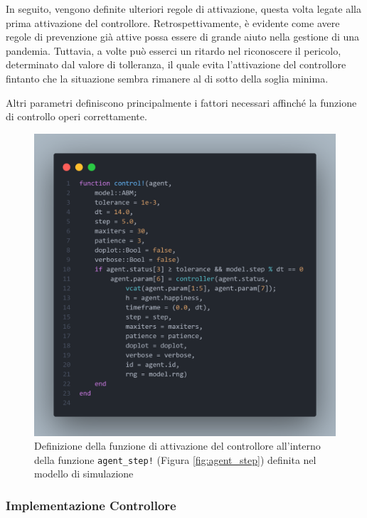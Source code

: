In seguito, vengono definite ulteriori regole di attivazione, 
questa volta legate alla prima attivazione del controllore. 
Retrospettivamente, è evidente come avere regole di prevenzione 
già attive possa essere di grande aiuto nella gestione di una pandemia. 
Tuttavia, a volte può esserci un ritardo nel riconoscere il pericolo, 
determinato dal valore di tolleranza, il quale evita l'attivazione 
del controllore fintanto che la situazione sembra rimanere al di sotto 
della soglia minima.

Altri parametri definiscono principalmente i fattori necessari affinché 
la funzione di controllo operi correttamente.

\begin{figure}[H]
    \begin{center}
		\includegraphics[width=\textwidth]{img/controller_neuralode.png}
		\caption{Definizione della funzione di attivazione del controllore all'interno della funzione \texttt{agent\_step!} (Figura \ref{fig:agent_step}) definita nel modello di simulazione}
		\label{fig:controller_abm}
	\end{center}
\end{figure}
 
\newpage

\subsubsection{Implementazione Controllore}

